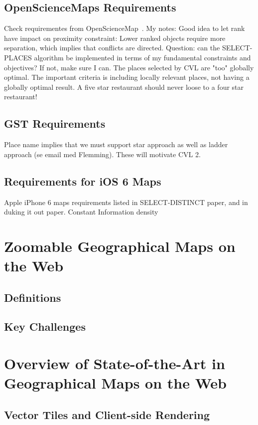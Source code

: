 \documentclass[11pt, oneside]{report}   	%
\begin{document}
\subsection{OpenScienceMaps Requirements}
Check requirementes from OpenScienceMap~\cite{schmid2013opensciencemap}. My notes: Good idea to let rank have impact on proximity constraint: Lower ranked objects require more separation, which implies that conflicts are directed. Question: can the SELECT-PLACES algorithm be implemented in terms of my fundamental constraints and objectives? If not, make sure I can. The places selected by CVL are "too" globally optimal. The important criteria is including locally relevant places, not having a globally optimal result. A five star restaurant should never loose to a four star restaurant!

\subsection{GST Requirements}
Place name implies that we must support star approach as well as ladder approach (se email med Flemming). These will motivate CVL 2.



\subsection{Requirements for iOS 6 Maps}
Apple iPhone 6 maps requirements listed in SELECT-DISTINCT paper, and in duking it out paper. Constant Information density




\section{Zoomable Geographical Maps on the Web}
\subsection{Definitions}
\subsection{Key Challenges}

\section{Overview of State-of-the-Art in Geographical Maps on the Web}
\subsection{Vector Tiles and Client-side Rendering}
\end{document}
